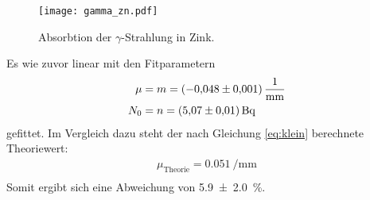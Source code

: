 \noindent
\begin{figure}[H]
  \centering
  \texttt{[image: gamma\_zn.pdf]}
  \caption{Absorbtion der $\gamma$-Strahlung in Zink.}
  \label{fig:gamma_zn}
\end{figure}
\noindent
Es wie zuvor linear
mit den Fitparametern
\begin{align}
    \mu &= m = \SI{-0.048\pm0.001}{\per\milli\meter} \\
    N_0 &= n = \SI{5.07\pm0.01}{\becquerel}
\end{align}
gefittet.
Im Vergleich dazu steht der nach Gleichung \eqref{eq:klein} berechnete Theoriewert:
\begin{align}
    \mu_\text{Theorie} = \SI{0.051}{\per\milli\meter} \\
\end{align}
Somit ergibt sich eine Abweichung von \SI{5.9\pm2.0}{\percent}.
%
